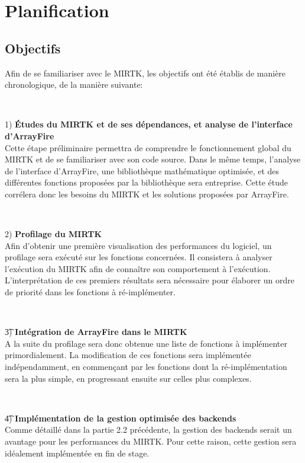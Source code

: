 \documentclass[10pt]{report}
\begin{document}
	\section{Planification}
	\subsection{Objectifs} 
	Afin de se familiariser avec le MIRTK, les objectifs ont été établis de manière chronologique, de la manière suivante: 
	~\par~\par 
	1) \textbf{Études du MIRTK et de ses dépendances, et analyse de l'interface d'ArrayFire} \\
	Cette étape préliminaire permettra de comprendre le fonctionnement global du MIRTK et de se familiariser avec son code source. Dans le même temps, l'analyse de l'interface d'ArrayFire, une bibliothèque mathématique optimisée, et des différentes fonctions proposées par la bibliothèque sera entreprise. Cette étude corrélera donc les besoins du MIRTK et les solutions proposées par ArrayFire.
	~\par~\par 
	2) \textbf{Profilage du MIRTK}\\
	Afin d'obtenir une première visualisation des performances du logiciel, un profilage sera exécuté sur les fonctions concernées. Il consistera à analyser l'exécution du MIRTK afin de connaître son comportement à l'exécution. L'interprétation de ces premiers résultats sera nécessaire pour élaborer un ordre de priorité dans les fonctions à ré-implémenter.
	~\par~\par 
	\t 3) \textbf{Intégration de ArrayFire dans le MIRTK} \\
	A la suite du profilage sera donc obtenue une liste de fonctions à implémenter primordialement. La modification de ces fonctions sera implémentée indépendamment, en commençant par les fonctions dont la ré-implémentation sera la plus simple, en progressant ensuite sur celles plus complexes.
	~\par~\par
	\t 4) \textbf{Implémentation de la gestion optimisée des backends} \\
	Comme détaillé dans la partie 2.2 précédente, la gestion des backends serait un avantage pour les performances du MIRTK. Pour cette raison, cette gestion sera idéalement implémentée en fin de stage. 
	~\par~\par 
\end{document}
